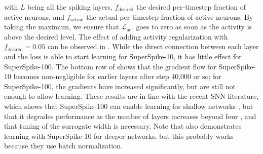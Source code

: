 \noindent with $L$ being all the spiking layers, $f_\text{desired}$ the desired per-timestep fraction of active neurons, and $f_\text{actual}$ the actual per-timestep fraction of active neurons. By taking the maximum, we ensure that $\mathcal{L}_\text{act}$ goes to zero as soon as the activity is above the desired level. The effect of adding activity regularization with $f_\text{desired} = 0.05$ can be observed in . While the direct connection between each layer and the loss is able to start learning for SuperSpike-10, it has little effect for SuperSpike-100. The bottom row of  shows that the gradient flow for SuperSpike-10 becomes non-negligible for earlier layers after step 40,000 or so; for SuperSpike-100, the gradients have increased significantly, but are still not enough to allow learning. 
These results are in line with the recent SNN literature, which shows that SuperSpike-100 can enable learning for shallow networks \cite{perez-nieves2021neural,zenke2021remarkable}, but that it degrades performance as the number of layers increases beyond four \cite{ledinauskas2020training}, and that tuning of the surrogate width is necessary. Note that \cite{ledinauskas2020training} also demonstrates learning with SuperSpike-10 for deeper networks, but this probably works because they use batch normalization.

%

